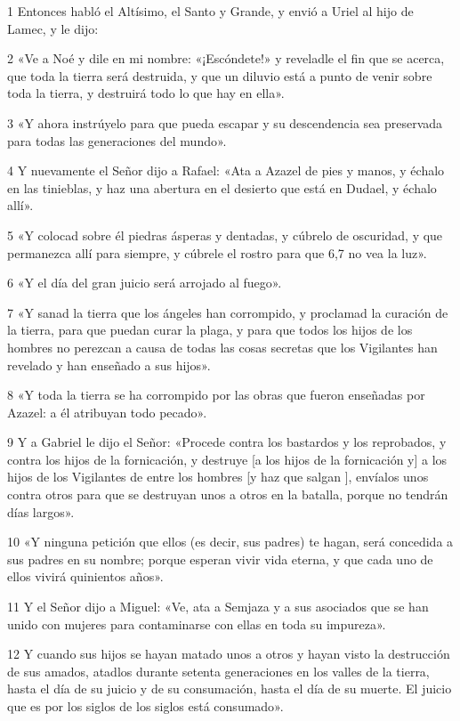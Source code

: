 \par 1 Entonces habló el Altísimo, el Santo y Grande, y envió a Uriel al hijo de Lamec, y le dijo:
\par 2 «Ve a Noé y dile en mi nombre: «¡Escóndete!» y reveladle el fin que se acerca, que toda la tierra será destruida, y que un diluvio está a punto de venir sobre toda la tierra, y destruirá todo lo que hay en ella».
\par 3 «Y ahora instrúyelo para que pueda escapar y su descendencia sea preservada para todas las generaciones del mundo».
\par 4 Y nuevamente el Señor dijo a Rafael: «Ata a Azazel de pies y manos, y échalo en las tinieblas, y haz una abertura en el desierto que está en Dudael, y échalo allí».
\par 5 «Y colocad sobre él piedras ásperas y dentadas, y cúbrelo de oscuridad, y que permanezca allí para siempre, y cúbrele el rostro para que 6,7 no vea la luz».
\par 6 «Y el día del gran juicio será arrojado al fuego».
\par 7 «Y sanad la tierra que los ángeles han corrompido, y proclamad la curación de la tierra, para que puedan curar la plaga, y para que todos los hijos de los hombres no perezcan a causa de todas las cosas secretas que los Vigilantes han revelado y han enseñado a sus hijos».
\par 8 «Y toda la tierra se ha corrompido por las obras que fueron enseñadas por Azazel: a él atribuyan todo pecado».
\par 9 Y a Gabriel le dijo el Señor: «Procede contra los bastardos y los reprobados, y contra los hijos de la fornicación, y destruye [a los hijos de la fornicación y] a los hijos de los Vigilantes de entre los hombres [y haz que salgan ], envíalos unos contra otros para que se destruyan unos a otros en la batalla, porque no tendrán días largos».
\par 10 «Y ninguna petición que ellos (es decir, sus padres) te hagan, será concedida a sus padres en su nombre; porque esperan vivir vida eterna, y que cada uno de ellos vivirá quinientos años».
\par 11 Y el Señor dijo a Miguel: «Ve, ata a Semjaza y a sus asociados que se han unido con mujeres para contaminarse con ellas en toda su impureza».
\par 12 Y cuando sus hijos se hayan matado unos a otros y hayan visto la destrucción de sus amados, atadlos durante setenta generaciones en los valles de la tierra, hasta el día de su juicio y de su consumación, hasta el día de su muerte. El juicio que es por los siglos de los siglos está consumado».
